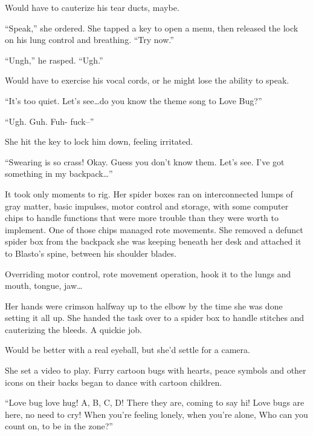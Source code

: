 Would have to cauterize his tear ducts, maybe.



``Speak,'' she ordered.  She tapped a key to open a menu, then released the lock on his lung control and breathing.  ``Try now.''



``Ungh,'' he rasped.  ``Ugh.''



Would have to exercise his vocal cords, or he might lose the ability to speak.



``It's too quiet.  Let's see\ldots do you know the theme song to Love Bug?''



``Ugh.  Guh.  Fuh- fuck--''



She hit the key to lock him down, feeling irritated.



``Swearing is so crass!  Okay.  Guess you don't know them.  Let's see.  I've got something in my backpack\ldots''



It took only moments to rig.  Her spider boxes ran on interconnected lumps of gray matter, basic impulses, motor control and storage, with some computer chips to handle functions that were more trouble than they were worth to implement.  One of those chips managed rote movements.  She removed a defunct spider box from the backpack she was keeping beneath her desk and attached it to Blasto's spine, between his shoulder blades.



Overriding motor control, rote movement operation, hook it to the lungs and mouth, tongue, jaw\ldots



Her hands were crimson halfway up to the elbow by the time she was done setting it all up.  She handed the task over to a spider box to handle stitches and cauterizing the bleeds.  A quickie job.



Would be better with a real eyeball, but she'd settle for a camera.



She set a video to play.  Furry cartoon bugs with hearts, peace symbols and other icons on their backs began to dance with cartoon children.



``Love bug love hug!  A, B, C, D!
There they are, coming to say hi!
Love bugs are here, no need to cry!
When you're feeling lonely, when you're alone,
Who can you count on, to be in the zone?''



